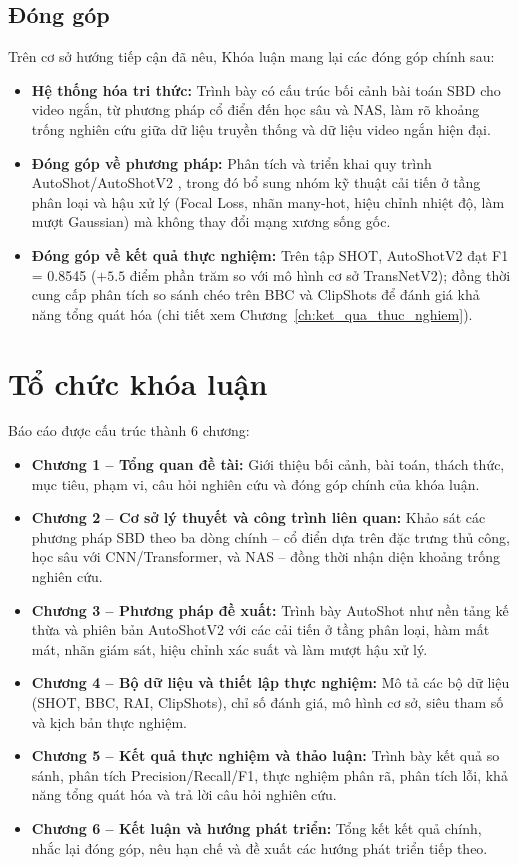 \subsection{Đóng góp}
Trên cơ sở hướng tiếp cận đã nêu, Khóa luận mang lại các đóng góp chính sau:
\begin{itemize}
    \item \textbf{Hệ thống hóa tri thức:} Trình bày có cấu trúc bối cảnh bài toán SBD cho video ngắn, từ phương pháp cổ điển đến học sâu và NAS, làm rõ khoảng trống nghiên cứu giữa dữ liệu truyền thống và dữ liệu video ngắn hiện đại.
    \item \textbf{Đóng góp về phương pháp:} Phân tích và triển khai quy trình AutoShot/AutoShotV2 \cite{zhu2023autoshot,soucek2020transnetv2}, trong đó bổ sung nhóm kỹ thuật cải tiến ở tầng phân loại và hậu xử lý (Focal Loss, nhãn many-hot, hiệu chỉnh nhiệt độ, làm mượt Gaussian) mà không thay đổi mạng xương sống gốc.
    \item \textbf{Đóng góp về kết quả thực nghiệm:} Trên tập SHOT, AutoShotV2 đạt F1 = 0.8545 ($+5.5$ điểm phần trăm so với mô hình cơ sở TransNetV2); đồng thời cung cấp phân tích so sánh chéo trên BBC và ClipShots để đánh giá khả năng tổng quát hóa (chi tiết xem Chương~\ref{ch:ket_qua_thuc_nghiem}).
\end{itemize}

\section{Tổ chức khóa luận}
Báo cáo được cấu trúc thành 6 chương:
\begin{itemize}
    \item \textbf{Chương 1 -- Tổng quan đề tài:} Giới thiệu bối cảnh, bài toán, thách thức, mục tiêu, phạm vi, câu hỏi nghiên cứu và đóng góp chính của khóa luận.
    \item \textbf{Chương 2 -- Cơ sở lý thuyết và công trình liên quan:} Khảo sát các phương pháp SBD theo ba dòng chính -- cổ điển dựa trên đặc trưng thủ công, học sâu với CNN/Transformer, và NAS -- đồng thời nhận diện khoảng trống nghiên cứu.
    \item \textbf{Chương 3 -- Phương pháp đề xuất:} Trình bày AutoShot như nền tảng kế thừa và phiên bản AutoShotV2 với các cải tiến ở tầng phân loại, hàm mất mát, nhãn giám sát, hiệu chỉnh xác suất và làm mượt hậu xử lý.
    \item \textbf{Chương 4 -- Bộ dữ liệu và thiết lập thực nghiệm:} Mô tả các bộ dữ liệu (SHOT, BBC, RAI, ClipShots), chỉ số đánh giá, mô hình cơ sở, siêu tham số và kịch bản thực nghiệm.
    \item \textbf{Chương 5 -- Kết quả thực nghiệm và thảo luận:} Trình bày kết quả so sánh, phân tích Precision/Recall/F1, thực nghiệm phân rã, phân tích lỗi, khả năng tổng quát hóa và trả lời câu hỏi nghiên cứu.
    \item \textbf{Chương 6 -- Kết luận và hướng phát triển:} Tổng kết kết quả chính, nhắc lại đóng góp, nêu hạn chế và đề xuất các hướng phát triển tiếp theo.
\end{itemize}


